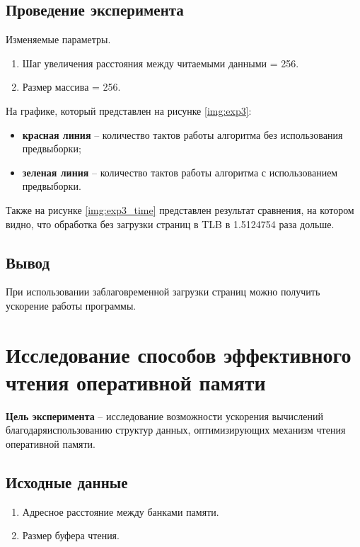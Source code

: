 \subsection{Проведение эксперимента}

Изменяемые параметры.

\begin{enumerate}
	\item Шаг увеличения расстояния между читаемыми данными = 256.
	\item Размер массива = 256.
\end{enumerate}

На графике, который представлен на рисунке \ref{img:exp3}:
\begin{itemize}
	\item \textbf{красная линия} -- количество тактов работы алгоритма без использования предвыборки;
	\item \textbf{зеленая линия} -- количество тактов работы алгоритма с использованием предвыборки.
\end{itemize}


%

\clearpage

Также на рисунке \ref{img:exp3_time} представлен результат сравнения, на котором видно, что обработка без загрузки страниц в TLB в 1.5124754 раза дольше.



\subsection{Вывод}

При использовании заблаговременной загрузки страниц можно получить ускорение работы программы.




\section{Исследование способов эффективного  чтения оперативной памяти}

\textbf{Цель эксперимента} -- исследование возможности ускорения вычислений благодаряиспользованию структур данных, оптимизирующих механизм чтения оперативной памяти.

\subsection{Исходные данные}
\begin{enumerate}
	\item Адресное расстояние между банками памяти.
	\item Размер буфера чтения.
\end{enumerate}

